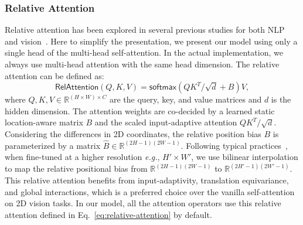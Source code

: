 \documentclass[runningheads]{llncs}
\def\eg{\emph{e.g.}, }
\begin{document}
\subsubsection{Relative Attention}
Relative attention has been explored in several previous studies for both NLP~\cite{shaw2018self,wu2019pay} and vision~\cite{liu2021swin,vaswani2021scaling,dai2021coatnet,jiang2021transgan}.
Here to simplify the presentation, we present our model using only a single head of the multi-head self-attention.
In the actual implementation, we always use multi-head attention with the same head dimension.
The relative attention can be defined as:
\begin{equation}
\label{eq:relative-attention}
\mathsf{RelAttention}(Q,K,V)=\mathsf{softmax}(QK^T/\sqrt{d}+B)V,
\end{equation}
where $Q,K,V\in \mathbb{R}^{(H\times W)\times C}$ are the query, key, and value matrices and $d$ is the hidden dimension.
The attention weights are co-decided by a learned static location-aware matrix $B$ and the scaled input-adaptive attention $QK^T/\sqrt{d}$.
Considering the differences in 2D coordinates, the relative position bias $B$ is parameterized by a matrix $\hat{B}\in\mathbb{R}^{(2H-1)(2W-1)}$.
Following typical practices~\cite{liu2021swin,dai2021coatnet}, when fine-tuned at a higher resolution \eg $H'\times W'$, we use bilinear interpolation to map the relative positional bias from $\mathbb{R}^{(2H-1)(2W-1)}$ to $\mathbb{R}^{(2H'-1)(2W'-1)}$.
This relative attention benefits from input-adaptivity, translation equivariance, and global interactions, which is a preferred choice over the vanilla self-attention on 2D vision tasks.
In our model, all the attention operators use this relative attention defined in Eq.~\ref{eq:relative-attention} by default.
\end{document}
